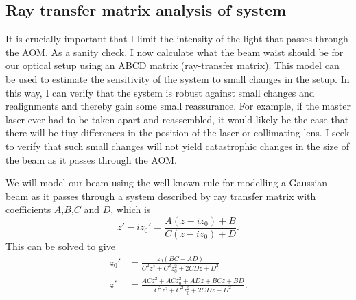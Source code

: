 \subsection{Ray transfer matrix analysis of system}
It is crucially important that I limit the intensity of the light that passes through the AOM. As a sanity check, I now calculate what the beam waist should be for our optical setup using an ABCD matrix (ray-transfer matrix). This model can be used to estimate the sensitivity of the system to small changes in the setup. In this way, I can verify that the system is robust against small changes and realignments and thereby gain some small reassurance. For example, if the master laser ever had to be taken apart and reassembled, it would likely be the case that there will be tiny differences in the position of the laser or collimating lens. I seek to verify that such small changes will not yield catastrophic changes in the size of the beam as it passes through the AOM.  


We will model our beam using the well-known rule \cite{BYUOpticsBook}\cite{lasersMilonniEberly} for modelling a Gaussian beam as it passes through a system described by ray transfer matrix with coefficients $A$,$B$,$C$ and $D$, which is 
\begin{equation} \label{ABCDlawforGaussianBeams}
z'-iz_0'=\frac{A(z-iz_0)+B}{C(z-iz_0)+D}.
\end{equation}
This can be solved to give 
\begin{align}
z_0' &= \frac{ z_0 (BC-AD)}{C^2z^2+C^2z_0^2+2 C D z + D^2} \\
z' &=\frac{AC z^2+ACz_0^2+ADz+BCz+BD}{C^2z^2+C^2z_0^2+2 C D z + D^2}.
\end{align}


